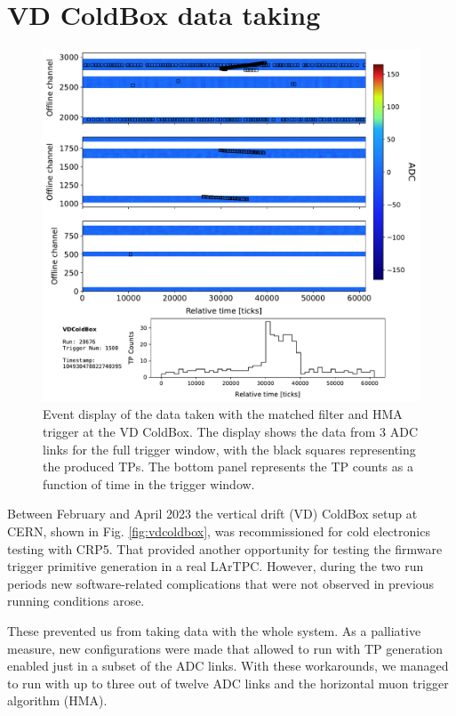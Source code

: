 \section{VD ColdBox data taking}

\begin{figure}[t]
    \centering
    \includegraphics[scale = 0.5]{Images/Matched_Filter/TRDisplay_np02_coldbox_run020676_0001.pdf}
    \caption[Event display of the data taken with the matched filter and HMA trigger at the VD ColdBox.]{Event display of the data taken with the matched filter and HMA trigger at the VD ColdBox. The display shows the data from 3 ADC links for the full trigger window, with the black squares representing the produced TPs. The bottom panel represents the TP counts as a function of time in the trigger window.}
    \label{fig:example_hma_evd}
\end{figure}

Between February and April 2023 the vertical drift (VD) ColdBox setup at CERN, shown in Fig. \ref{fig:vdcoldbox}, was recommissioned for cold electronics testing with CRP5. That provided another opportunity for testing the firmware trigger primitive generation in a real LArTPC. However, during the two run periods new software-related complications that were not observed in previous running conditions arose.

These prevented us from taking data with the whole system. As a palliative measure, new configurations were made that allowed to run with TP generation enabled just in a subset of the ADC links. With these workarounds, we managed to run with up to three out of twelve ADC links and the horizontal muon trigger algorithm (HMA).

